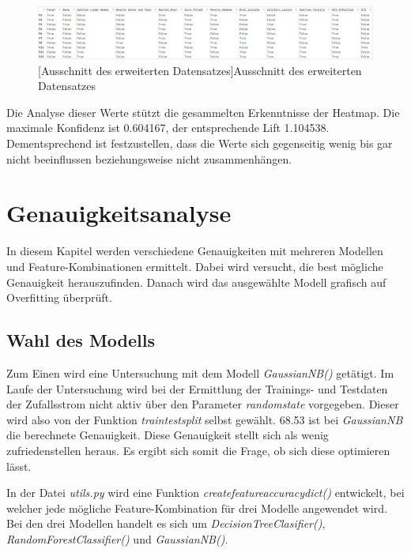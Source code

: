 \documentclass[13pt,a4paper, listof=entryprefix, bibliography=totocnumbered,toc=listofnumbered,lof=listofnumbered]{scrartcl}
\begin{document}
	\begin{figure}[H]
		\centering
		\includegraphics[width=0.8\linewidth]{Bilder/tranp_df.png}
		[Ausschnitt des erweiterten Datensatzes]{Ausschnitt des erweiterten Datensatzes}
		\label{fig:transp_feature}
	\end{figure}

Die Analyse dieser Werte stützt die gesammelten Erkenntnisse der Heatmap. Die maximale Konfidenz ist 0.604167, der entsprechende Lift
1.104538. Dementsprechend ist festzustellen, dass die Werte sich gegenseitig wenig bis gar nicht beeinflussen beziehungsweise nicht zusammenhängen. 


	\section{Genauigkeitsanalyse}
		\label{ch:genauigkeit_analyse}

In diesem Kapitel werden verschiedene Genauigkeiten mit mehreren Modellen und Feature-Kombinationen ermittelt. Dabei wird versucht, die best mögliche Genauigkeit herauszufinden. 
Danach wird das ausgewählte Modell grafisch auf Overfitting überprüft.  

	\subsection{Wahl des Modells}
		\label{ch:wahl_modell}

Zum Einen wird eine Untersuchung mit dem Modell \textit{GaussianNB()} getätigt. Im Laufe der Untersuchung wird bei der Ermittlung der Trainings- und Testdaten der Zufallsstrom 
nicht aktiv über den Parameter \textit{random\textunderscore state} vorgegeben. Dieser wird also von der Funktion \textit{train\textunderscore test\textunderscore split} selbst gewählt.
68.53 ist bei \textit{GaussianNB} die berechnete Genauigkeit. Diese Genauigkeit stellt sich als wenig zufriedenstellen heraus. Es ergibt sich somit die Frage,
ob sich diese optimieren lässt.

In der Datei \textit{utils.py} wird eine Funktion \textit{create\textunderscore feature\textunderscore accuracy\textunderscore dict()} entwickelt, bei welcher jede mögliche Feature-Kombination für drei Modelle angewendet wird. 
Bei den drei Modellen handelt es sich um  \textit{DecisionTreeClasifier()}, \textit{RandomForestClassifier()} und \textit{GaussianNB()}. 
\end{document}
